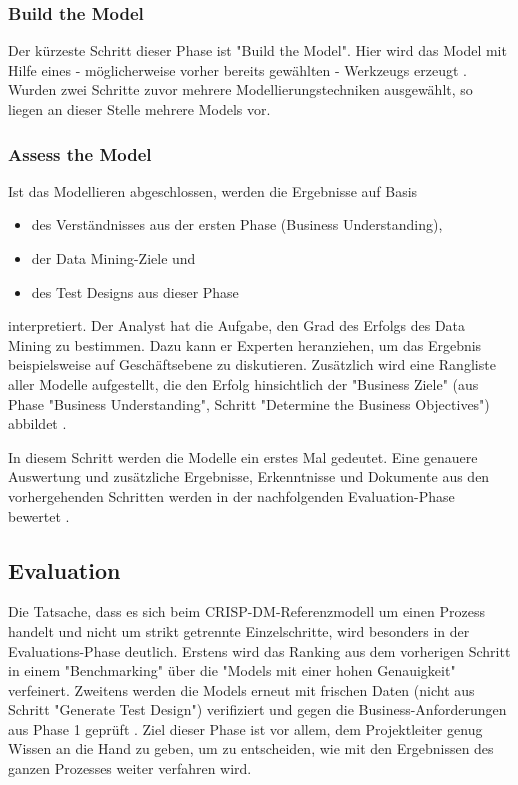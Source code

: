 \subsubsection{Build the Model}
Der kürzeste Schritt dieser Phase ist "Build the Model". Hier wird das Model mit Hilfe eines - möglicherweise vorher bereits gewählten - Werkzeugs erzeugt . Wurden zwei Schritte zuvor mehrere Modellierungstechniken ausgewählt, so liegen an dieser Stelle mehrere Models vor.

\subsubsection{Assess the Model}
Ist das Modellieren abgeschlossen, werden die Ergebnisse auf Basis 
\begin{itemize}
\item des Verständnisses aus der ersten Phase (Business Understanding),
\item der Data Mining-Ziele und
\item des Test Designs aus dieser Phase
\end{itemize}
interpretiert. Der Analyst hat die Aufgabe, den Grad des Erfolgs des Data Mining zu bestimmen. Dazu kann er Experten heranziehen, um das Ergebnis beispielsweise auf Geschäftsebene zu diskutieren. Zusätzlich wird eine Rangliste aller Modelle aufgestellt, die den Erfolg hinsichtlich der "Business Ziele" (aus Phase "Business Understanding", Schritt "Determine the Business Objectives") abbildet . \par
In diesem Schritt werden die Modelle ein erstes Mal gedeutet. Eine genauere Auswertung und zusätzliche Ergebnisse, Erkenntnisse und Dokumente aus den vorhergehenden Schritten werden in der nachfolgenden Evaluation-Phase bewertet \citep[S.25]{chapman_crisp-dm_2000}.


\subsection{Evaluation}
Die Tatsache, dass es sich beim CRISP-DM-Referenzmodell um einen Prozess handelt und nicht um strikt getrennte Einzelschritte, wird besonders in der Evaluations-Phase deutlich. Erstens wird das Ranking aus dem vorherigen Schritt in einem "Benchmarking" über die "Models mit einer hohen Genauigkeit"\citep[S.~73; eigene Übersetzung]{swamynathan_mastering_2017} verfeinert. Zweitens werden die Models erneut mit frischen Daten (nicht aus Schritt "Generate Test Design") verifiziert und gegen die Business-Anforderungen aus Phase 1 geprüft \citep[S.~73]{swamynathan_mastering_2017}. Ziel dieser Phase ist vor allem, dem Projektleiter genug Wissen an die Hand zu geben, um zu entscheiden, wie mit den Ergebnissen des ganzen Prozesses weiter verfahren wird. 

